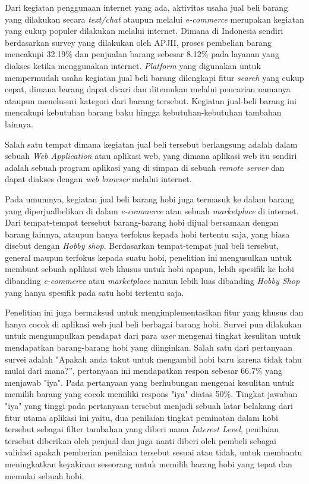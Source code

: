 \documentclass[a4paper]{article}
\begin{document}
Dari kegiatan penggunaan internet yang ada, aktivitas usaha jual beli barang yang dilakukan secara \textit{text/chat} ataupun melalui \textit{e-commerce} merupakan kegiatan yang cukup populer dilakukan melalui internet. Dimana di Indonesia sendiri berdasarkan survey yang dilakukan oleh APJII, proses pembelian barang mencakupi 32.19\% dan penjualan barang sebesar 8.12\% pada layanan yang diakses ketika menggunakan internet\autocite{indonesia2017infografis}. \textit{Platform} yang digunakan untuk mempermudah usaha kegiatan jual beli barang dilengkapi fitur \textit{search} yang cukup cepat, dimana barang dapat dicari dan ditemukan melalui pencarian namanya ataupun menelusuri kategori dari barang tersebut. Kegiatan jual-beli barang ini mencakupi kebutuhan barang baku hingga kebutuhan-kebutuhan tambahan lainnya.


Salah satu tempat dimana kegiatan jual beli tersebut berlangsung adalah dalam sebuah \textit{Web Application} atau aplikasi web, yang dimana aplikasi web itu sendiri adalah sebuah program aplikasi yang di simpan di sebuah \textit{remote server} dan dapat diakses dengan \textit{web browser} melalui internet\autocite{what-is-web-app}.


Pada umumnya, kegiatan jual beli barang hobi juga termasuk ke dalam barang yang diperjualbelikan di dalam \textit{e-commerce} atau sebuah \textit{marketplace} di internet. Dari tempat-tempat tersebut barang-barang hobi dijual bersamaan dengan barang lainnya, ataupun hanya terfokus kepada hobi tertentu saja, yang biasa disebut dengan \textit{Hobby shop}. Berdasarkan tempat-tempat jual beli tersebut, general maupun terfokus kepada suatu hobi, penelitian ini mengusulkan untuk membuat sebuah aplikasi web khusus untuk hobi apapun, lebih spesifik ke hobi dibanding \textit{e-commerce} atau \textit{marketplace} namun lebih luas dibanding \textit{Hobby Shop} yang hanya spesifik pada satu hobi tertentu saja.


Penelitian ini juga bermaksud untuk mengimplementasikan fitur yang khusus dan hanya cocok di aplikasi web jual beli berbagai barang hobi. Survei pun dilakukan untuk mengumpulkan pendapat dari para \textit{user} mengenai tingkat kesulitan untuk mendapatkan barang-barang hobi yang diinginkan. Salah satu dari pertanyaan survei adalah "Apakah anda takut untuk mengambil hobi baru karena tidak tahu mulai dari mana?”, pertanyaan ini mendapatkan respon sebesar 66.7\% yang menjawab "iya". Pada pertanyaan yang berhubungan mengenai kesulitan untuk memilih barang yang cocok memiliki respons "iya" diatas 50\%. Tingkat jawaban "iya" yang tinggi pada pertanyaan tersebut menjadi sebuah latar belakang dari fitur utama aplikasi ini yaitu, dua penilaian tingkat peminatan dalam hobi tersebut sebagai filter tambahan yang diberi nama \textit{Interest Level}, penilaian tersebut diberikan oleh penjual dan juga nanti diberi oleh pembeli sebagai validasi apakah pemberian penilaian tersebut sesuai atau tidak, untuk membantu meningkatkan keyakinan seseorang untuk memilih barang hobi yang tepat dan memulai sebuah hobi.
\end{document}
